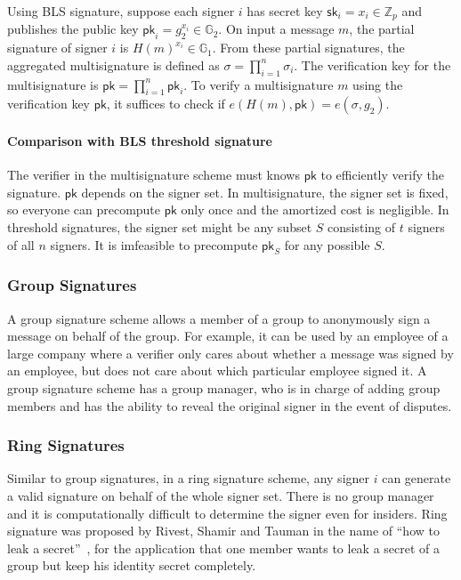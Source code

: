 Using BLS signature, suppose each signer $i$ has secret key $\mathsf{sk}_i = x_i\in \mathbb{Z}_p$ and publishes the public key $\mathsf{pk}_i = g_2^{x_i}\in \mathbb{G}_2$. On input a message $m$, the partial signature of signer $i$ is $H(m)^{x_i} \in \mathbb{G}_1$. From these partial signatures, the aggregated multisignature is defined as $\sigma = \prod_{i=1}^n \sigma_i$. The verification key for the multisignature is $\mathsf{pk} = \prod_{i=1}^n \mathsf{pk}_i$. To verify a multisignature $m$ using the verification key $\mathsf{pk}$, it suffices to check if $e(H(m), \mathsf{pk}) = e(\sigma, g_2)$. 

\paragraph{Comparison with BLS threshold signature} The verifier in the multisignature scheme must knows $\mathsf{pk}$ to efficiently verify the signature. $\mathsf{pk}$ depends on the signer set. In multisignature, the signer set is fixed, so everyone can precompute $\mathsf{pk}$ only once and the amortized cost is negligible. In threshold signatures, the signer set might be any subset $S$ consisting of $t$ signers of all $n$ signers. It is imfeasible to precompute $\mathsf{pk}_S$ for any possible $S$. 

\subsubsection{Group Signatures} 
A group signature scheme allows a member of a group to anonymously sign a message on behalf of the group. For example, it can be used by an employee of a large company where a verifier only cares about whether a message was signed by an employee, but does not care about which particular employee signed it. A group signature scheme has a group manager, who is in charge of adding group members and has the ability to reveal the original signer in the event of disputes. 

\subsubsection{Ring Signatures} 
Similar to group signatures, in a ring signature scheme, any signer $i$ can generate a valid signature on behalf of the whole signer set. There is no group manager and it is computationally difficult to determine the signer even for insiders. Ring signature was proposed by Rivest, Shamir and Tauman in the name of ``how to leak a secret''~\cite{DBLP:conf/asiacrypt/RivestST01}, for the application that one member wants to leak a secret of a group but keep his identity secret completely. 

